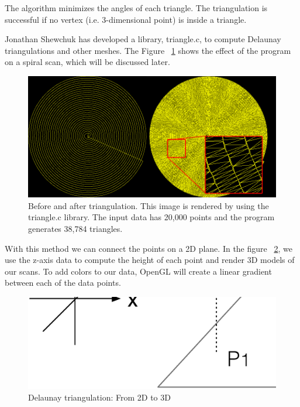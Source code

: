 The algorithm minimizes the angles of each triangle. The triangulation is successful if no vertex (i.e. 3-dimensional point) is inside a triangle.

Jonathan Shewchuk \cite{shewchuk96b} has developed a library, triangle.c, to compute Delaunay triangulations and other meshes. The Figure ~\ref{triangulation2d} shows the effect of the program on a spiral scan, which will be discussed later. 
\begin{figure}[!ht]
  \centering
  \includegraphics[scale=0.45]{images/triangulation.png}
    \caption{Before and after triangulation. This image is rendered by using the triangle.c library. The input data has 20,000 points and the program generates 38,784 triangles.}
  \label{triangulation2d}
\end{figure}

With this method we can connect the points on a 2D plane. In the figure  ~\ref{triangulation3d}, we use the z-axis data to compute the height of each point and render 3D models of our scans. To add colors to our data, OpenGL will create a linear gradient between each of the data points.

\begin{figure}[!ht]
  \centering
  \includegraphics[scale=0.2]{images/delaunay.eps}
    \caption{Delaunay triangulation: From 2D to 3D}
  \label{triangulation3d}
\end{figure}

